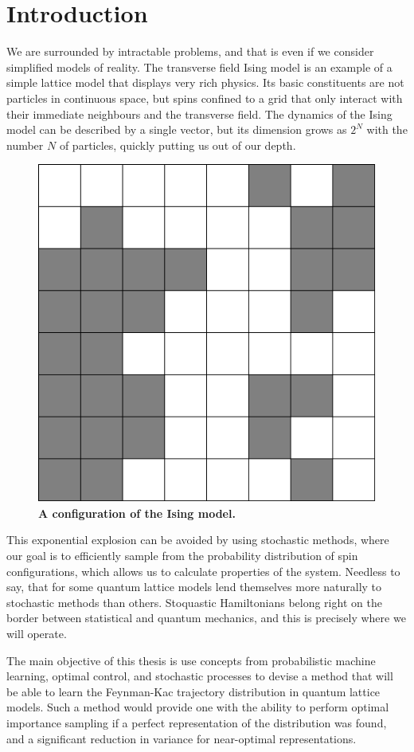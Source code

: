 
\chapter{Introduction}
\label{chapter1}

We are surrounded by intractable problems, and that is even if we consider simplified models of reality. The transverse field Ising model is an example of a simple lattice model that displays very rich physics. Its basic constituents are not particles in continuous space, but spins confined to a grid that only interact with their immediate neighbours and the transverse field. The dynamics of the Ising model can be described by a single vector, but its dimension grows as $2^N$ with the number $N$ of particles, quickly putting us out of our depth. 
\begin{figure}[h]
	\centering
	\includegraphics[width=0.25\linewidth]{Chapter1/ising_passive0}
	\caption[A configuration of the Ising model.]{\textbf{A configuration of the Ising model.}}
	\label{fig:isingpassive0}
\end{figure}
This exponential explosion can be avoided by using stochastic methods, where our goal is to efficiently sample from the probability distribution of spin configurations, which allows us to calculate properties of the system. Needless to say, that for some quantum lattice models lend themselves more naturally to stochastic methods than others. Stoquastic Hamiltonians belong right on the border between statistical and quantum mechanics, and this is precisely where we will operate.

The main objective of this thesis is use concepts from probabilistic machine learning, optimal control, and stochastic processes to devise a method that will be able to learn the Feynman-Kac trajectory distribution in quantum lattice models. Such a method would provide one with the ability to perform optimal importance sampling if a perfect representation of the distribution was found, and a significant reduction in variance for near-optimal representations. 

